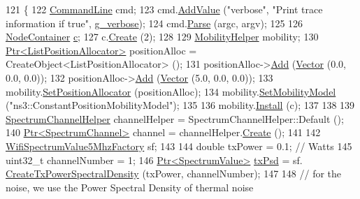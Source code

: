 \begin{DoxyCode}
121 \{
122   \hyperlink{classns3_1_1CommandLine}{CommandLine} cmd;
123   cmd.\hyperlink{classns3_1_1CommandLine_addcfb546c7ad4c8bd0965654d55beb8e}{AddValue} (\textcolor{stringliteral}{"verbose"}, \textcolor{stringliteral}{"Print trace information if true"}, \hyperlink{adhoc-aloha-ideal-phy_8cc_a817b47f52eeb5f98e32ce7d19a86aa7e}{g\_verbose});
124   cmd.\hyperlink{classns3_1_1CommandLine_a5c10b85b3207e5ecb48d907966923156}{Parse} (argc, argv);
125 
126   \hyperlink{classns3_1_1NodeContainer}{NodeContainer} \hyperlink{lte_2model_2fading-traces_2fading__trace__generator_8m_ae0323a9039add2978bf5b49550572c7c}{c};
127   c.\hyperlink{classns3_1_1NodeContainer_a787f059e2813e8b951cc6914d11dfe69}{Create} (2);
128 
129   \hyperlink{classns3_1_1MobilityHelper}{MobilityHelper} mobility;
130   \hyperlink{classns3_1_1Ptr}{Ptr<ListPositionAllocator>} positionAlloc = CreateObject<ListPositionAllocator> 
      ();
131   positionAlloc->\hyperlink{classns3_1_1ListPositionAllocator_a460e82f015ac012a73ba0ea0cccb3486}{Add} (\hyperlink{classns3_1_1Vector3D_a7e59b47bc94c9cb1dadff68c1d0112d8}{Vector} (0.0, 0.0, 0.0));
132   positionAlloc->\hyperlink{classns3_1_1ListPositionAllocator_a460e82f015ac012a73ba0ea0cccb3486}{Add} (\hyperlink{classns3_1_1Vector3D_a7e59b47bc94c9cb1dadff68c1d0112d8}{Vector} (5.0, 0.0, 0.0));
133   mobility.\hyperlink{classns3_1_1MobilityHelper_ac59d5295076be3cc11021566713a28c5}{SetPositionAllocator} (positionAlloc);
134   mobility.\hyperlink{classns3_1_1MobilityHelper_a030275011b6f40682e70534d30280aba}{SetMobilityModel} (\textcolor{stringliteral}{"ns3::ConstantPositionMobilityModel"});
135 
136   mobility.\hyperlink{classns3_1_1MobilityHelper_a07737960ee95c0777109cf2994dd97ae}{Install} (c);
137 
138 
139   \hyperlink{classns3_1_1SpectrumChannelHelper}{SpectrumChannelHelper} channelHelper = SpectrumChannelHelper::Default ();
140   \hyperlink{classns3_1_1Ptr}{Ptr<SpectrumChannel>} channel = channelHelper.\hyperlink{classns3_1_1SpectrumChannelHelper_a419ea84f5046763085f94f38af319fb9}{Create} ();
141 
142   \hyperlink{classns3_1_1WifiSpectrumValue5MhzFactory}{WifiSpectrumValue5MhzFactory} sf;
143 
144   \textcolor{keywordtype}{double} txPower = 0.1; \textcolor{comment}{// Watts}
145   uint32\_t channelNumber = 1;
146   \hyperlink{classns3_1_1Ptr}{Ptr<SpectrumValue>} \hyperlink{lte__link__budget_8m_a684fe3101a5e48a5fcc57cab8dbcd1aa}{txPsd} =  sf.
      \hyperlink{classns3_1_1WifiSpectrumValue5MhzFactory_aa3045151889d535e6e7bf40e0855a92f}{CreateTxPowerSpectralDensity} (txPower, channelNumber);
147 
148   \textcolor{comment}{// for the noise, we use the Power Spectral Density of thermal noise}

\end{DoxyCode}
